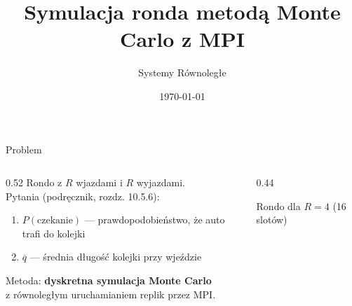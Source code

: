 \documentclass[aspectratio=169]{beamer}
\title[Traffic Circle MPI]{Symulacja ronda metodą Monte Carlo z MPI}
\author{Systemy Równoległe}
\date{\today}
\begin{document}

\begin{frame}
  \titlepage
\end{frame}

\begin{frame}{Problem}
  \begin{columns}
    \begin{column}{0.52\textwidth}
      Rondo z $R$ wjazdami i $R$ wyjazdami.\\[0.4em]
      Pytania (podręcznik, rozdz. 10.5.6):
      \begin{enumerate}
        \item[(a)] $P(\text{czekanie})$ — prawdopodobieństwo, że auto trafi do kolejki
        \item[(b)] $\overline{q}$ — średnia długość kolejki przy wjeździe
      \end{enumerate}
      \bigskip
      Metoda: \textbf{dyskretna symulacja Monte Carlo}\\
      z równoległym uruchamianiem replik przez MPI.
    \end{column}
    \begin{column}{0.44\textwidth}

      \centering\small Rondo dla $R=4$ (16 slotów)
    \end{column}
  \end{columns}
\end{frame}
\end{document}
